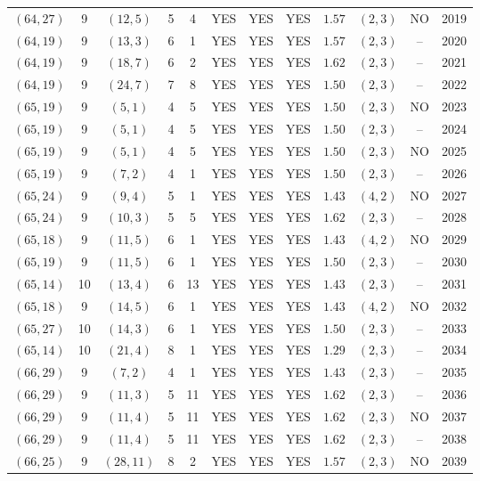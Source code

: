 \begin{longtable}{|c|c|c|c|c|c|c|c|c|c|c|c|}
$(64,27)$ & 9 & $(12,5)$ & 5 & 4 & YES & YES & YES & $1.57$ & $(2,3)$ & NO & 2019\\
$(64,19)$ & 9 & $(13,3)$ & 6 & 1 & YES & YES & YES & $1.57$ & $(2,3)$ & -- & 2020\\
$(64,19)$ & 9 & $(18,7)$ & 6 & 2 & YES & YES & YES & $1.62$ & $(2,3)$ & -- & 2021\\
$(64,19)$ & 9 & $(24,7)$ & 7 & 8 & YES & YES & YES & $1.50$ & $(2,3)$ & -- & 2022\\
$(65,19)$ & 9 & $(5,1)$ & 4 & 5 & YES & YES & YES & $1.50$ & $(2,3)$ & NO & 2023\\
$(65,19)$ & 9 & $(5,1)$ & 4 & 5 & YES & YES & YES & $1.50$ & $(2,3)$ & -- & 2024\\
$(65,19)$ & 9 & $(5,1)$ & 4 & 5 & YES & YES & YES & $1.50$ & $(2,3)$ & NO & 2025\\
$(65,19)$ & 9 & $(7,2)$ & 4 & 1 & YES & YES & YES & $1.50$ & $(2,3)$ & -- & 2026\\
$(65,24)$ & 9 & $(9,4)$ & 5 & 1 & YES & YES & YES & $1.43$ & $(4,2)$ & NO & 2027\\
$(65,24)$ & 9 & $(10,3)$ & 5 & 5 & YES & YES & YES & $1.62$ & $(2,3)$ & -- & 2028\\
$(65,18)$ & 9 & $(11,5)$ & 6 & 1 & YES & YES & YES & $1.43$ & $(4,2)$ & NO & 2029\\
$(65,19)$ & 9 & $(11,5)$ & 6 & 1 & YES & YES & YES & $1.50$ & $(2,3)$ & -- & 2030\\
$(65,14)$ & 10 & $(13,4)$ & 6 & 13 & YES & YES & YES & $1.43$ & $(2,3)$ & -- & 2031\\
$(65,18)$ & 9 & $(14,5)$ & 6 & 1 & YES & YES & YES & $1.43$ & $(4,2)$ & NO & 2032\\
$(65,27)$ & 10 & $(14,3)$ & 6 & 1 & YES & YES & YES & $1.50$ & $(2,3)$ & -- & 2033\\
$(65,14)$ & 10 & $(21,4)$ & 8 & 1 & YES & YES & YES & $1.29$ & $(2,3)$ & -- & 2034\\
$(66,29)$ & 9 & $(7,2)$ & 4 & 1 & YES & YES & YES & $1.43$ & $(2,3)$ & -- & 2035\\
$(66,29)$ & 9 & $(11,3)$ & 5 & 11 & YES & YES & YES & $1.62$ & $(2,3)$ & -- & 2036\\
$(66,29)$ & 9 & $(11,4)$ & 5 & 11 & YES & YES & YES & $1.62$ & $(2,3)$ & NO & 2037\\
$(66,29)$ & 9 & $(11,4)$ & 5 & 11 & YES & YES & YES & $1.62$ & $(2,3)$ & -- & 2038\\
$(66,25)$ & 9 & $(28,11)$ & 8 & 2 & YES & YES & YES & $1.57$ & $(2,3)$ & NO & 2039\\

\end{longtable}
